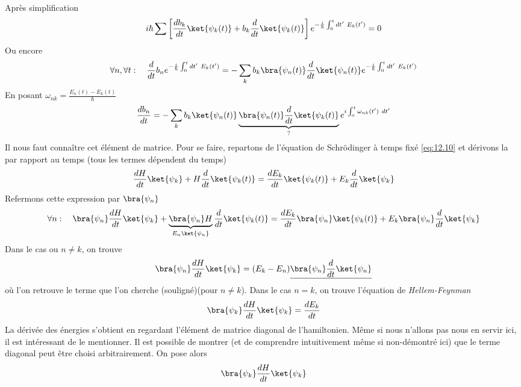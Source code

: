Après simplification
\begin{equation}
i\hbar\sum\left[\dfrac{db_k}{dt}\ket{\psi_k(t)} + b_k\dfrac{d}{dt}\ket{\psi_k(t)}\right]
e^{-\frac{i}{\hbar}\int_0^t dt'\ E_k(t')} = 0
\end{equation}
Ou encore
\begin{equation}
\forall n, \forall t :\quad \frac{d}{dt}b_n e^{-\frac{i}{\hbar}\int_0^t dt'\ E_k(t')} = -\sum_k 
b_k\bra{\psi_n(t)}\frac{d}{dt}\ket{\psi_n(t)}e^{-\frac{i}{\hbar}\int_0^t dt'\ E_k(t')}
\end{equation}
En posant $\omega_{nk} = \frac{E_n(t)-E_k(t)}{\hbar}$
\begin{equation}
\dfrac{db_n}{dt} =-\sum_kb_k \ket{\psi_n(t)}\underbrace{\bra{\psi_n(t)}\frac{d}{dt}\ket{\psi_k(t)}}_{?}
e^{i\int_0^t \omega_{nk}(t')\ dt'}
\end{equation}
Il nous faut connaître cet élément de matrice. Pour se faire, repartons de l'équation de Schrödinger à 
temps fixé \eqref{eq:12.10} et dérivons la par rapport au temps (tous les termes dépendent du temps)
\begin{equation}
\dfrac{dH}{dt}\ket{\psi_k} + H\dfrac{d}{dt}\ket{\psi_k(t)} = \dfrac{dE_k}{dt}\ket{\psi_k(t)} + E_k
\dfrac{d}{dt}\ket{\psi_k}
\end{equation}
Refermons cette expression par $\bra{\psi_n}$
\begin{equation}
\forall n :\quad \bra{\psi_n}\dfrac{dH}{dt}\ket{\psi_k} + \underbrace{\bra{\psi_n}H}_{E_n\ket{\psi_n}}\dfrac{d}{dt}\ket{\psi_k(t)} = \dfrac{dE_k}{dt}\bra{\psi_n}\ket{\psi_k(t)} + E_k\bra{\psi_n}\dfrac{d}{dt}\ket{\psi_k}
\end{equation}
Dans le cas ou $n\neq k$, on trouve
\begin{equation}
\bra{\psi_n}\frac{dH}{dt}\ket{\psi_k} = (E_k-E_n)\underline{\bra{\psi_n}\frac{d}{dt}\ket{\psi_n}}
\end{equation}
où l'on retrouve le terme que l'on cherche (souligné)(pour $n\neq k$). Dans le cas $n=k$, on trouve 
l'équation de \textit{Hellem-Feynman}
\begin{equation}
\bra{\psi_k}\dfrac{dH}{dt}\ket{\psi_k} = \dfrac{dE_k}{dt}
\end{equation}
La dérivée des énergies s'obtient en regardant l'élément de matrice diagonal de l'hamiltonien. Même si nous n'allons pas nous en servir ici, il est intéressant de le mentionner. Il est possible de montrer (et de 
comprendre intuitivement même si non-démontré ici) que le terme diagonal peut être choisi arbitrairement. On 
pose alors
\begin{equation}
\bra{\psi_k}\dfrac{dH}{dt}\ket{\psi_k}
\end{equation}
